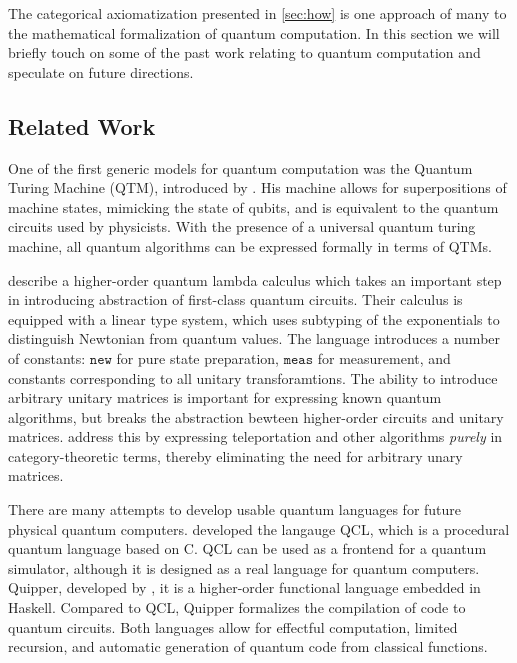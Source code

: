 The categorical axiomatization presented in \cref{sec:how} is one approach of many
to the mathematical formalization of quantum computation. In this section
we will briefly touch on some of the past work relating to quantum computation
and speculate on future directions.

\subsection{Related Work} 

One of the first generic models for quantum computation was the Quantum
Turing Machine (QTM), introduced by \cite{deutsch1985}. His machine allows for superpositions
of machine states, mimicking the state of qubits, and is equivalent to the
quantum circuits used by physicists. With the presence of a universal quantum turing
machine, all quantum algorithms can be expressed formally in terms of QTMs. 

\cite{selinger2006lambda,selinger2009quantum} describe a higher-order quantum lambda 
calculus which  takes an important step in introducing abstraction of first-class 
quantum circuits.
Their calculus is equipped with a linear type system, which uses subtyping of the
exponentials to distinguish Newtonian from quantum values. The language introduces
a number of constants: $\texttt{new}$ for pure state preparation,
$\texttt{meas}$ for measurement, and constants corresponding to all unitary
transforamtions. The ability to introduce arbitrary unitary matrices is
important for expressing known quantum algorithms, but breaks the abstraction 
bewteen higher-order circuits and unitary matrices. \cite{abramsky2009categorical}
address this by expressing teleportation and other algorithms \emph{purely} in
category-theoretic terms, thereby eliminating the need for arbitrary unary matrices.

There are many attempts to develop usable quantum languages for future physical quantum
computers. \cite{omer2000quantum} developed the langauge QCL, which is a procedural
quantum language based on C. QCL can be used as a frontend for a quantum simulator,
although it is designed as a real language for quantum computers. Quipper,
developed by \cite{green13quipper}, 
it is a higher-order functional language embedded in Haskell. Compared to QCL,
Quipper formalizes the compilation of code to quantum circuits.
Both languages allow for effectful computation, limited recursion, and automatic
generation of quantum code from classical functions.


